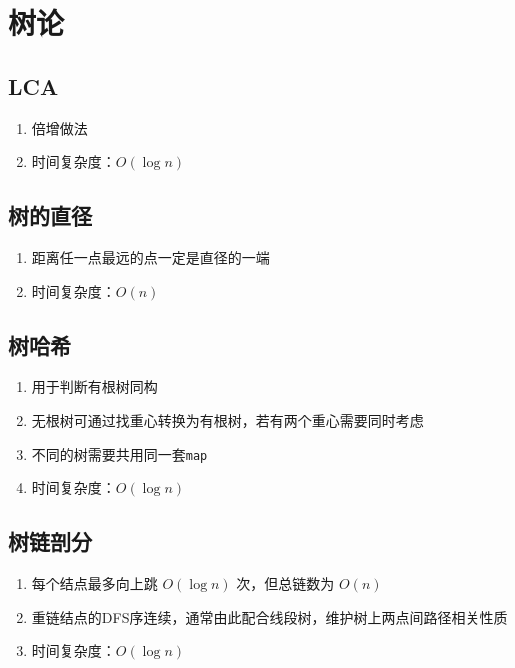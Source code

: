 \documentclass[twocolumn,a4,8pt]{article}  %
\begin{document}
	\section{树论}
		\subsection{LCA}
			\noindent\begin{enumerate}
				\item 倍增做法
				\item 时间复杂度：$O(\log n)$
				\end{enumerate}
	 	 	
	 	 	
		\subsection{树的直径}
			\noindent\begin{enumerate}
				\item 距离任一点最远的点一定是直径的一端
				\item 时间复杂度：$O(n)$
			\end{enumerate}
	 	 	
	 	 	
		\subsection{树哈希}
			\noindent\begin{enumerate}
				\item 用于判断有根树同构
				\item 无根树可通过找重心转换为有根树，若有两个重心需要同时考虑
				\item 不同的树需要共用同一套\texttt{map}
				\item 时间复杂度：$O(\log n)$
			\end{enumerate}
	 	 	
	 	 	
		\subsection{树链剖分}
			\noindent\begin{enumerate}
				\item 每个结点最多向上跳 $O(\log n)$ 次，但总链数为 $O(n)$
				\item 重链结点的DFS序连续，通常由此配合线段树，维护树上两点间路径相关性质
				\item 时间复杂度：$O(\log n)$
			\end{enumerate}
	 	 	
	 	 	
\end{document}
